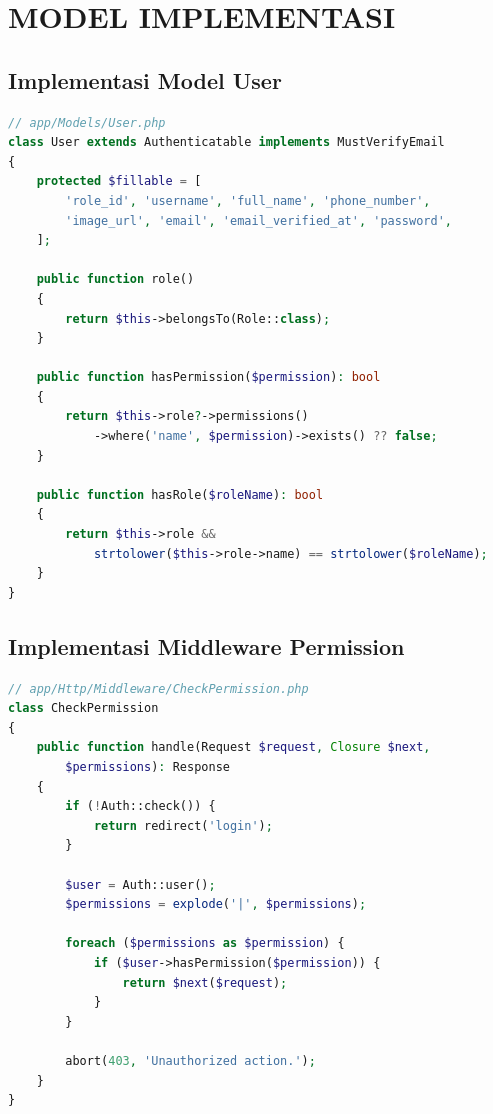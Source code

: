 \documentclass[12pt,a4paper]{article}
\begin{document}
\newpage

\section{MODEL IMPLEMENTASI}

\subsection{Implementasi Model User}
\begin{lstlisting}[language=PHP]
// app/Models/User.php
class User extends Authenticatable implements MustVerifyEmail
{
    protected $fillable = [
        'role_id', 'username', 'full_name', 'phone_number',
        'image_url', 'email', 'email_verified_at', 'password',
    ];

    public function role()
    {
        return $this->belongsTo(Role::class);
    }

    public function hasPermission($permission): bool
    {
        return $this->role?->permissions()
            ->where('name', $permission)->exists() ?? false;
    }

    public function hasRole($roleName): bool
    {
        return $this->role && 
            strtolower($this->role->name) == strtolower($roleName);
    }
}
\end{lstlisting}

\subsection{Implementasi Middleware Permission}
\begin{lstlisting}[language=PHP]
// app/Http/Middleware/CheckPermission.php
class CheckPermission
{
    public function handle(Request $request, Closure $next, 
        $permissions): Response
    {
        if (!Auth::check()) {
            return redirect('login');
        }
        
        $user = Auth::user();
        $permissions = explode('|', $permissions);
        
        foreach ($permissions as $permission) {
            if ($user->hasPermission($permission)) {
                return $next($request);
            }
        }

        abort(403, 'Unauthorized action.');
    }
}
\end{lstlisting}
\end{document}
